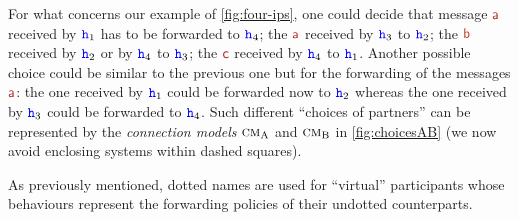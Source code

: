 For what concerns  our example of \cref{fig:four-ips},
 one could decide that message $\msg[a]$ received by ${\mathtt{\color{blue}{ {h}}}}_1$ has 
 to be forwarded
 to ${\mathtt{\color{blue}{ {h}}}}_4$; the $\msg[a]$ received by ${\mathtt{\color{blue}{ {h}}}}_3$
 to ${\mathtt{\color{blue}{ {h}}}}_2$; the $\msg[b]$ received by ${\mathtt{\color{blue}{ {h}}}}_2$ 
 or by ${\mathtt{\color{blue}{ {h}}}}_4$ to ${\mathtt{\color{blue}{ {h}}}}_3$; 
 the $\msg[c]$ received by ${\mathtt{\color{blue}{ {h}}}}_4$ to ${\mathtt{\color{blue}{ {h}}}}_1$.
 Another possible choice %
could be similar to the previous one but for the forwarding
of the messages $\msg[a]$: the one received by ${\mathtt{\color{blue}{ {h}}}}_1$ could be forwarded now to ${\mathtt{\color{blue}{ {h}}}}_2$
whereas the one received by ${\mathtt{\color{blue}{ {h}}}}_3$ could be forwarded to ${\mathtt{\color{blue}{ {h}}}}_4$. 
 Such different ``choices of partners'' can be represented 
 by the {\em connection models} $\text{\sc cm}_\mathrm{A}$ and $\text{\sc cm}_\mathrm{B}$ in \cref{fig:choicesAB} (we now avoid enclosing systems within dashed squares).
  
As previously mentioned, dotted names are used for ``virtual'' participants whose behaviours  represent 
 the forwarding policies of their undotted counterparts.
 

